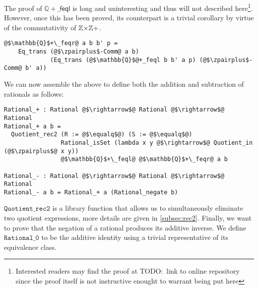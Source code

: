 \documentclass[12pt,twoside,maitrise]{dms}
\theoremstyle{definition}
\numberwithin{equation}{section}
\numberwithin{table}{chapter}
\numberwithin{figure}{chapter}
\newcommand\kw[1] {\textsf{#1}}
\newcommand\id[1] {\texttt{#1}}
\begin{document}
The proof of $\mathbb{Q}{+}\_\kw{feql}$ is long and uninteresting and thus will
not described here\footnote{Interested readers may find the proof at TODO:\ link
to online repository since the proof itself is not instructive enought to
warrant being put here}. However, once this has been proved, its counterpart is
a trivial corollary by virtue of the commutativity of $\mathbb{Z}{\times}\mathbb{Z}+$.

\begin{verbatim}
@$\mathbb{Q}$+\_feqr@ a b b' p =
    Eq_trans (@$\zpairplus$-Comm@ a b)
             (Eq_trans (@$\mathbb{Q}$@+_feql b b' a p) (@$\zpairplus$-Comm@ b' a))
\end{verbatim}

We can now assemble the above to define both the addition and subtraction of
rationals as follows:

\begin{verbatim}
Rational_+ : Rational @$\rightarrow$@ Rational @$\rightarrow$@ Rational
Rational_+ a b =
  Quotient_rec2 (R := @$\equalq$@) (S := @$\equalq$@)
                Rational_isSet (lambda x y @$\rightarrow$@ Quotient_in (@$\zpairplus$@ x y))
                @$\mathbb{Q}$+\_feql@ @$\mathbb{Q}$+\_feqr@ a b

Rational_- : Rational @$\rightarrow$@ Rational @$\rightarrow$@ Rational
Rational_- a b = Rational_+ a (Rational_negate b)
\end{verbatim}

$\id{Quotient\_rec2}$ is a library function that allows us to simultaneously
eliminate two quotient expressions, more details are given in
\autoref{subsec:rec2}. Finally, we want to prove that the negation of a rational
produces its additive inverse. We define $\id{Rational\_0}$ to be the additive
identity using a trivial representative of its equivalence class.
\end{document}
